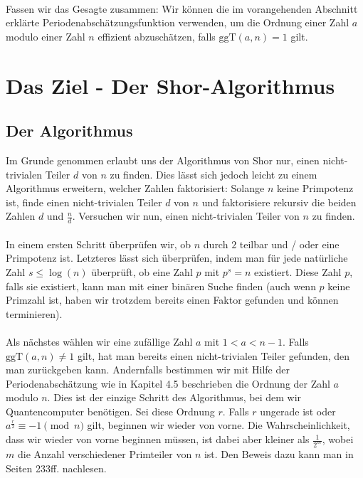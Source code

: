 \paragraph{}
Fassen wir das Gesagte zusammen: Wir können die im vorangehenden Abschnitt erklärte Periodenabschätzungsfunktion verwenden, um die Ordnung einer Zahl $a$ modulo einer Zahl $n$ effizient abzuschätzen, falls $\text{ggT}(a, n) = 1$ gilt.

\section{Das Ziel - Der Shor-Algorithmus}
\subsection{Der Algorithmus}
Im Grunde genommen erlaubt uns der Algorithmus von Shor nur, einen nicht-trivialen Teiler $d$ von $n$ zu finden. Dies lässt sich jedoch leicht zu einem Algorithmus erweitern, welcher Zahlen faktorisiert: Solange $n$ keine Primpotenz ist, finde einen nicht-trivialen Teiler $d$ von $n$ und faktorisiere rekursiv die beiden Zahlen $d$ und $\frac{n}{d}$. Versuchen wir nun, einen nicht-trivialen Teiler von $n$ zu finden.

\paragraph{}
In einem ersten Schritt überprüfen wir, ob $n$ durch $2$ teilbar und / oder eine Primpotenz ist. Letzteres lässt sich überprüfen, indem man für jede natürliche Zahl $s \leq \log(n)$ überprüft, ob eine Zahl $p$ mit $p^s = n$ existiert. Diese Zahl $p$, falls sie existiert, kann man mit einer binären Suche finden (auch wenn $p$ keine Primzahl ist, haben wir trotzdem bereits einen Faktor gefunden und können terminieren).
\paragraph{}
Als nächstes wählen wir eine zufällige Zahl $a$ mit $1 < a < n - 1$. Falls $\text{ggT}(a, n) \neq 1$ gilt, hat man bereits einen nicht-trivialen Teiler gefunden, den man zurückgeben kann. Andernfalls bestimmen wir mit Hilfe der Periodenabschätzung wie in Kapitel 4.5 beschrieben die Ordnung der Zahl $a$ modulo $n$. Dies ist der einzige Schritt des Algorithmus, bei dem wir Quantencomputer benötigen. Sei diese Ordnung $r$. Falls $r$ ungerade ist oder $a^\frac{r}{2} \equiv -1 \pmod{n}$ gilt, beginnen wir wieder von vorne. Die Wahrscheinlichkeit, dass wir wieder von vorne beginnen müssen, ist dabei aber kleiner als $\frac{1}{2^m}$,  wobei $m$ die Anzahl verschiedener Primteiler von $n$ ist. Den Beweis dazu kann man in \cite{QC} Seiten 233ff. nachlesen.

